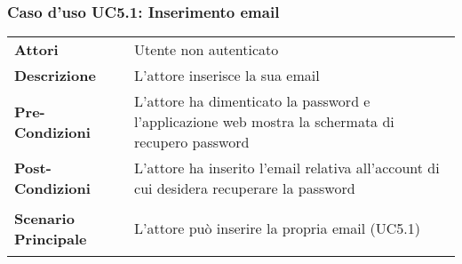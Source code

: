 \subsubsection{Caso d'uso UC5.1: Inserimento email}
\label{UC5_1}

\begin{minipage}{\linewidth}
\begin{longtable}{ l | p{11cm}}
	\hline
	\rowcolor{Gray}
	 \multicolumn{2}{c}{UC5.1 - Inserimento email} \\
	 \hline
	\textbf{Attori} & Utente non autenticato \\
	\textbf{Descrizione} & L'attore inserisce la sua email \\
	\textbf{Pre-Condizioni} & L'attore ha dimenticato la password e l'applicazione web mostra la schermata di recupero password \\
	\textbf{Post-Condizioni} & L'attore ha inserito l'email relativa all'account di cui desidera recuperare la password \\
	\textbf{Scenario Principale} & \begin{enumerate*}[label=(\arabic*.),itemjoin={\newline}]
		\item L'attore può inserire la propria email (UC5.1)
	\end{enumerate*}\\
\end{longtable}
\end{minipage}